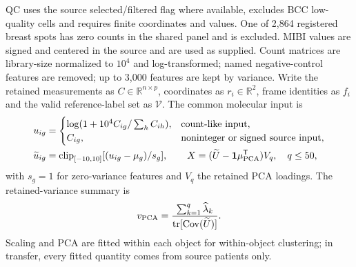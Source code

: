 \documentclass[11pt]{article}
\begin{document}
QC uses the source selected/filtered flag where available, excludes BCC low-quality cells and requires finite coordinates and values. One of 2,864 registered breast spots has zero counts in the shared panel and is excluded. MIBI values are signed and centered in the source and are used as supplied. Count matrices are library-size normalized to \(10^4\) and log-transformed; named negative-control features are removed; up to 3,000 features are kept by variance. Write the retained measurements as \(C\in\mathbb{R}^{n\times p}\), coordinates as \(r_i\in\mathbb{R}^2\), frame identities as \(f_i\) and the valid reference-label set as \(\mathcal V\). The common molecular input is
\begin{align}
u_{ig}&=\begin{cases}\log(1+10^4 C_{ig}/\sum_h C_{ih}),&\text{count-like input},\\ C_{ig},&\text{noninteger or signed source input},\end{cases}\label{eq:normalization}\\
\widetilde u_{ig}&=\operatorname{clip}_{[-10,10]}[(u_{ig}-\mu_g)/s_g],\qquad
X=(\widetilde U-\mathbf{1}\mu_{\rm PCA}^{\mathsf T})V_q,\quad q\leq50,\label{eq:pca}
\end{align}
with \(s_g=1\) for zero-variance features and \(V_q\) the retained PCA loadings. The retained-variance summary is
\begin{equation}
v_{\rm PCA}=\frac{\sum_{k=1}^{q}\widehat\lambda_k}{\operatorname{tr}[\operatorname{Cov}(\widetilde U)]}.\label{eq:variance}
\end{equation}
Scaling and PCA are fitted within each object for within-object clustering; in transfer, every fitted quantity comes from source patients only.
\end{document}
